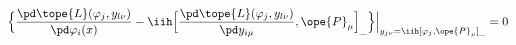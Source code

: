 \begin{equation}	\label{12.129}
\Bigl\{
\frac{\pd\tope{L}(\varphi_j,y_{l\nu})} {\pd \varphi_i(x)}
-
\iih
\Bigl[
\frac{\pd\tope{L}(\varphi_j,y_{l\nu})} {\pd y_{i\mu}}
,
\ope{P}_{\mu}
\Bigr]_{\_}
\Bigr\}
\Big|_{ y_{j\nu}=\iih[\varphi_j,\ope{P}_{\nu}]_{\_} }
=0
	\end{equation}

